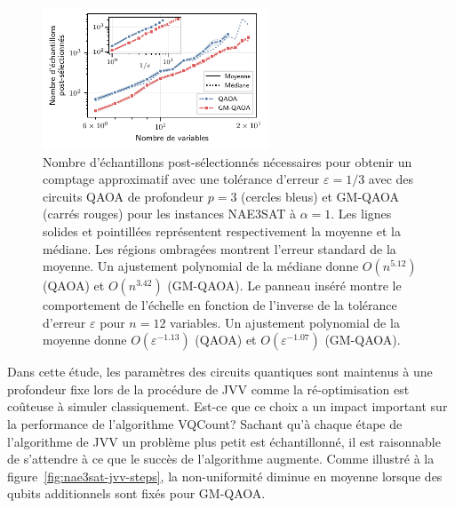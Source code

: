 \begin{figure}[H]
    \centering
    \includegraphics[width=0.6\textwidth]{figures/nae3sat-scaling.pdf}
    \caption[Comportement d'échelle du nombre d'échantillons post-sélectés pour \#NAE3SAT]{Nombre d'échantillons post-sélectionnés nécessaires pour obtenir un comptage approximatif avec une tolérance d'erreur $\varepsilon=1/3$ avec des circuits QAOA de profondeur $p=3$ (cercles bleus) et GM-QAOA (carrés rouges) pour les instances NAE3SAT à $\alpha=1$. Les lignes solides et pointillées représentent respectivement la moyenne et la médiane. Les régions ombragées montrent l'erreur standard de la moyenne. Un ajustement polynomial de la médiane donne $O(n^{5.12})$ (QAOA) et $O(n^{3.42})$ (GM-QAOA). Le panneau inséré montre le comportement de l'échelle en fonction de l'inverse de la tolérance d'erreur $\varepsilon$ pour $n=12$ variables. Un ajustement polynomial de la moyenne donne $O(\varepsilon^{-1.13})$ (QAOA) et $O(\varepsilon^{-1.07})$ (GM-QAOA).}
    \label{fig:nae3sat-scaling}
\end{figure}

Dans cette étude, les paramètres des circuits quantiques sont maintenus à une profondeur fixe lors de la procédure de JVV comme la ré-optimisation est coûteuse à simuler classiquement. Est-ce que ce choix a un impact important sur la performance de l'algorithme VQCount? Sachant qu'à chaque étape de l'algorithme de JVV un problème plus petit est échantillonné, il est raisonnable de s'attendre à ce que le succès de l'algorithme augmente. Comme illustré à la figure~\ref{fig:nae3sat-jvv-steps}, la non-uniformité diminue en moyenne lorsque des qubits additionnels sont fixés pour GM-QAOA. 


